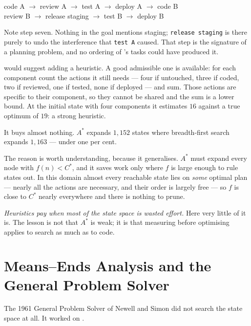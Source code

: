 \begin{center}\ttfamily\small
code A \textrm{$\rightarrow$} review A \textrm{$\rightarrow$} test A
\textrm{$\rightarrow$} deploy A \textrm{$\rightarrow$} code B\\
review B \textrm{$\rightarrow$} release staging \textrm{$\rightarrow$} test B
\textrm{$\rightarrow$} deploy B
\end{center}

Note step seven. Nothing in the goal mentions staging; \texttt{release staging} is
there purely to undo the interference that \texttt{test A} caused. That step is the
signature of a planning problem, and no ordering of 's tasks
could have produced it.

\begin{alertbox}
 would suggest adding a heuristic. A good admissible one is
available: for each component count the actions it still needs --- four if
untouched, three if coded, two if reviewed, one if tested, none if deployed --- and
sum. Those actions are specific to their component, so they cannot be shared and
the sum is a lower bound. At the initial state with four components it estimates
$16$ against a true optimum of $19$: a strong heuristic.

It buys almost nothing. $A^{*}$ expands $1{,}152$ states where breadth-first search
expands $1{,}163$ --- under one per cent.

The reason is worth understanding, because it generalises. $A^{*}$ must expand every
node with $f(n) < C^{*}$, and it saves work only where $f$ is large enough to rule
states out. In this domain almost every reachable state lies on \emph{some} optimal
plan --- nearly all the actions are necessary, and their order is largely free ---
so $f$ is close to $C^{*}$ nearly everywhere and there is nothing to prune.

\emph{Heuristics pay when most of the state space is wasted effort.} Here very
little of it is. The lesson is not that $A^{*}$ is weak; it is that measuring
before optimising applies to search as much as to code.
\end{alertbox}

\section{Means--Ends Analysis and the General Problem Solver}

The 1961 General Problem Solver of Newell and Simon did not search the state space
at all. It worked on .

